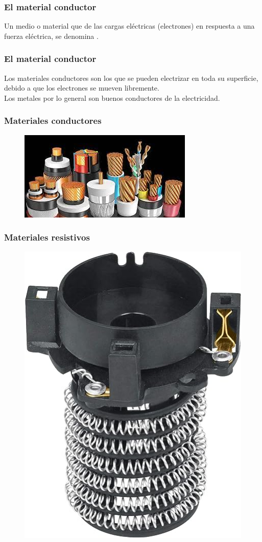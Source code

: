 \documentclass[14pt]{beamer}
\begin{document}
\begin{frame}
\frametitle{El material conductor}
Un medio o material que  de las cargas eléctricas (electrones)
en respuesta a una fuerza eléctrica, se denomina .
\end{frame}
\begin{frame}
\frametitle{El material conductor}    
Los materiales conductores son los que se pueden electrizar en toda su superficie, debido a que los electrones se mueven libremente.
\\
\bigskip
\pause
Los metales por lo general son buenos conductores de la electricidad.
\end{frame}
\begin{frame}
\frametitle{Materiales conductores}
\begin{figure}
    \centering
    \includegraphics[scale=0.8]{Imagenes/Materiales_Conductores_01.jpg}
\end{figure}
\end{frame}
\begin{frame}
\frametitle{Materiales resistivos}
\begin{figure}
    \centering
    \includegraphics[scale=0.3]{Imagenes/Materiales_Conductores_02.jpg}
\end{figure}
\end{frame}
    
\end{document}
